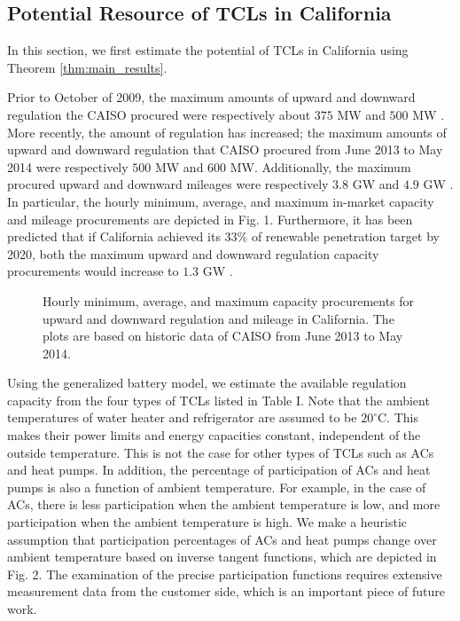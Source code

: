 \documentclass[onecolumn,journal]{IEEEtran}
\begin{document}
\subsection{Potential Resource of \acp{TCL} in California}
In this section, we first estimate the potential of \acp{TCL} in California using Theorem \ref{thm:main_results}.

Prior to October of 2009, the maximum amounts of upward and downward regulation the \ac{CAISO} procured were respectively about $375$ MW and $500$ MW \cite{CAISO_regulation}. More recently, the amount of regulation has increased; the maximum amounts of upward and downward regulation that \ac{CAISO} procured from June 2013 to May 2014 were respectively $500$ MW and $600$ MW. Additionally, the maximum procured upward and downward mileages were respectively $3.8$ GW and $4.9$ GW \cite{OASIS}.  In particular, the hourly minimum, average, and maximum in-market capacity and mileage procurements are depicted in Fig.  1. Furthermore, it has been predicted that if California achieved its $33\%$ of renewable penetration target by 2020, both the maximum upward and downward regulation capacity procurements would increase to $1.3$ GW \cite{helman2010resource}. 

\begin{figure}[tb]
\centering
{}
\caption{Hourly minimum, average, and maximum capacity procurements for upward and downward regulation and mileage in California. The plots are based on historic data of \ac{CAISO} from June 2013 to May 2014.}\label{fig:capacity}
\end{figure}

Using the generalized battery model, we estimate the available regulation capacity from the four types of \acp{TCL} listed in Table I. Note that the ambient  temperatures of water heater and refrigerator are assumed to be $20 ^\circ$C. This makes their power limits and energy capacities constant, independent of the outside temperature. This is not the case for other types of \acp{TCL} such as ACs and heat pumps. In addition, the percentage of participation of ACs and heat pumps is also a function of ambient  temperature. For example, in the case of ACs, there is less participation when the ambient temperature is low, and more participation when the ambient temperature is high. We make a heuristic assumption that participation percentages of ACs and heat pumps change over ambient temperature based on inverse tangent functions, which are depicted in Fig.  2. The examination of the precise participation functions requires extensive measurement data from the customer side, which is an important piece of future work.
\end{document}
